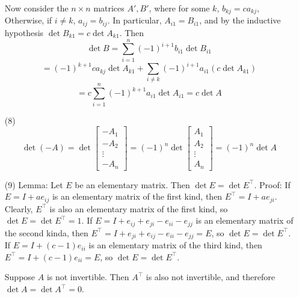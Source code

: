 \begin{itemize}
Now consider the $n \times n$ matrices $A', B'$, where for some $k$, $b_{kj} = ca_{kj}$, Otherwise, if $i \neq k$, $a_{ij} = b_{ij}$. In particular, $A_{i1} = B_{i1}$, and by the inductive hypothesis $\det B_{k1} = c\det A_{k1}$. Then
$$\det B = \sum_{i=1}^n (-1)^{i+1}b_{i1}\det B_{i1}$$
$$= (-1)^{k+1}ca_{kj}\det A_{k1} + \sum_{i \neq k}(-1)^{i + 1}a_{i1}(c\det A_{k1})$$ 
$$= c\sum_{i=1}^n (-1)^{k+1}a_{i1}\det A_{i1} = c\det A$$
\item[(8)]
$$\det(-A) = \det\begin{bmatrix}
-A_1 \\
\hline
-A_2 \\
\hline
\vdots \\
\hline
-A_n
\end{bmatrix} = (-1)^n\det\begin{bmatrix}
A_1 \\
\hline
A_2 \\
\hline
\vdots \\
\hline
A_n
\end{bmatrix} = (-1)^{n}\det A$$
\item[(9)]
Lemma: Let $E$ be an elementary matrix. Then $\det E = \det E^\top$. Proof: If $E = I + ae_{ij}$ is an elementary matrix of the first kind, then $E^\top = I + ae_{ji}$. Clearly, $E^\top$ is also an elementary matrix of the first kind, so $\det E = \det E^\top = 1$. If $E = I + e_{ij} + e_{ji} - e_{ii} - e_{jj}$ is an elementary matrix of the second kinda, then $E^\top = I + e_{ji} + e_{ij} - e_{ii} - e_{jj} = E$, so $\det E = \det E^\top$. If $E = I + (c - 1)e_{ii}$ is an elementary matrix of the third kind, then $E^\top = I +  (c - 1)e_{ii} = E$, so $\det E = \det E^\top$. 

Suppose $A$ is not invertible. Then $A^\top$ is also not invertible, and therefore $\det A = \det A^\top = 0$.


\end{itemize}
